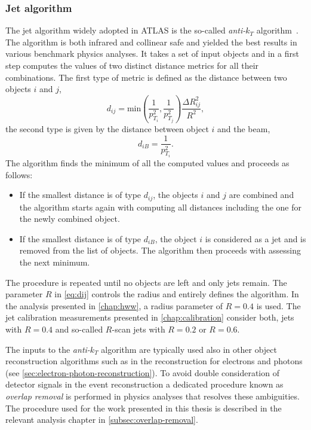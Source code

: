 

\subsubsection{Jet algorithm}
The jet algorithm widely adopted in ATLAS is the so-called \emph{anti-$k_T$} algorithm~\cite{Cacciari:2008gp}. The algorithm is both infrared and collinear safe and yielded the best results in various benchmark physics analyses. 
It takes a set of input objects and in a first step computes the values of two distinct distance metrics for all their combinations.
The first type of metric is defined as the distance between two objects $i$ and $j$,
\begin{equation}
    d_{ij} = \text{min}\left(\frac{1}{p_{T_i}^2},\frac{1}{p_{T_j}^2}\right) \frac{\Delta R_{ij}^2}{R^2},
    \label{eq:dij}
\end{equation}
the second type is given by the distance between object $i$ and the beam,
\begin{equation}
    d_{iB} = \frac{1}{p_{T_i}^2}.
\end{equation}
The algorithm finds the minimum of all the computed values and proceeds as follows:
\begin{itemize}
    \item If the smallest distance is of type $d_{ij}$, the objects $i$ and $j$ are combined and the algorithm starts again with computing all distances including the one for the newly combined object.
    \item If the smallest distance is of type $d_{iB}$, the object $i$ is considered as a jet and is removed from the list of objects. The algorithm then proceeds with assessing the next minimum.
\end{itemize}
The procedure is repeated until no objects are left and only jets remain.
The parameter $R$ in \cref{eq:dij} controls the radius and entirely defines the algorithm.
In the \HWW analysis presented in \cref{chap:hww}, a radius parameter of $R = 0.4$ is used. The jet calibration measurements presented in \cref{chap:calibration} consider both, jets with $R = 0.4$ and so-called $R$-scan jets with $R = 0.2$ or $R = 0.6$.

The inputs to the \emph{anti-$k_T$} algorithm are typically used also in other object reconstruction algorithms such as in the reconstruction for electrons and photons (see \cref{sec:electron-photon-reconstruction}).
To avoid double consideration of detector signals in the event reconstruction a dedicated procedure known as \emph{overlap removal} is performed in physics analyses that resolves these ambiguities. The procedure used for the work presented in this thesis is described in the relevant analysis chapter in \cref{subsec:overlap-removal}.


